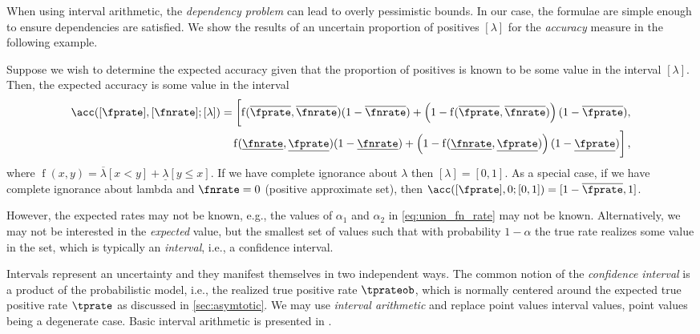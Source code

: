 \documentclass[ ../main.tex]{subfiles}
\begin{document}
When using interval arithmetic, the \emph{dependency problem} can lead to overly pessimistic bounds.
In our case, the formulae are simple enough to ensure dependencies are satisfied. We show the results of an uncertain proportion of positives $[\lambda]$ for the \emph{accuracy} measure in the following example.

\begin{example}
	Suppose we wish to determine the expected accuracy given that the proportion of positives is known to be some value in the interval 
	$[\lambda]$. Then, the expected accuracy is some value in the interval
	\begin{equation}
		\begin{split}
		\acc([\fprate],[\fnrate] ; [\lambda]) =
		\biggl[
		\operatorname{f}(\overline{\fprate},\overline{\fnrate})(1-\overline{\fnrate}) + 
		\left(1-\operatorname{f}(\overline{\fprate},\overline{\fnrate})\right)(1-\overline{\fprate}),\\
		\operatorname{f}(\underline{\fnrate},\underline{\fprate})(1-\underline{\fnrate}) + 
		\left(1-\operatorname{f}(\underline{\fnrate},\underline{\fprate})\right)(1-\underline{\fprate})
		\biggr]\,,
		\end{split}
		\end{equation}
		where $\operatorname{f}(x,y) = \overline{\lambda}[x < y] + 
		\underline{\lambda}[y \leq x]$. If we have complete ignorance about 
		$\lambda$ then $[\lambda] = [0,1]$. As a special case, if we have 
		complete 
		ignorance about lambda and $\fnrate = 0$ (positive approximate set), 
		then 
		$\acc([\fprate],0 ; [0,1]) = [1-\overline{\fprate}, 1]$.
\end{example}

However, the expected rates may not be known, e.g., the values of $\alpha_1$ and $\alpha_2$ in \cref{eq:union_fn_rate} may not be known.
Alternatively, we may not be interested in the \emph{expected} value, but the smallest set of values such that with probability $1-\alpha$ the true rate 
realizes some value in the set, which is typically an \emph{interval}, i.e., a confidence interval.

Intervals represent an uncertainty and they manifest themselves in two independent ways.
The common notion of the \emph{confidence interval} is a product of the probabilistic model, i.e., the realized true positive rate $\tprateob$, which is normally centered around the expected true positive rate $\tprate$ as discussed in \cref{sec:asymtotic}.
We may use \emph{interval arithmetic} and replace point values interval values, point values being a degenerate case.
Basic interval arithmetic is presented in \cite{basicinterval}.
\end{document}
